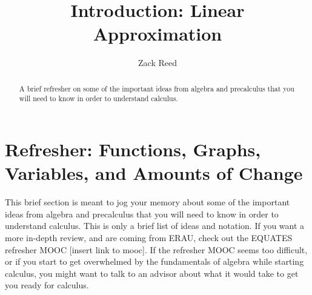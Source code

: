 \documentclass{ximera}
\title{Introduction: Linear Approximation}
\author{Zack Reed}
\begin{document}
\begin{abstract}
    A brief refresher on some of the important ideas from algebra and precalculus that you will need to know in order to understand calculus.
\end{abstract}
\maketitle

\section{Refresher: Functions, Graphs, Variables, and Amounts of Change}

This brief section is meant to jog your memory about some of the important ideas from algebra and precalculus that you will need to know in order to understand calculus. This is only a brief list of ideas and notation. If you want a more in-depth review, and are coming from ERAU, check out the EQUATES refresher MOOC [insert link to mooc]. If the refresher MOOC seems too difficult, or if you start to get overwhelmed by the fundamentals of algebra while starting calculus, you might want to talk to an advisor about what it would take to get you ready for calculus. 
\end{document}
